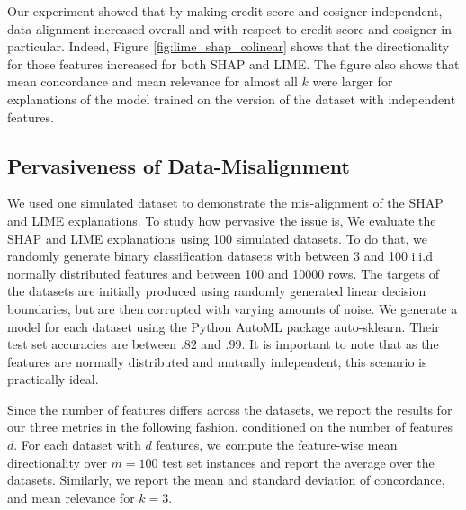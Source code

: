 \documentclass[12pt]{article}  %
\begin{document}
    Our experiment showed that by making credit score and cosigner independent, data-alignment increased overall and with respect to credit score and cosigner in particular. Indeed, Figure \ref{fig:lime_shap_colinear} shows that the directionality for those features increased for both SHAP and LIME. The figure also shows that mean concordance and mean relevance for almost all $k$ were larger for explanations of the model trained on the version of the dataset with independent features. 
   

\vspace{-3mm}  \subsection{Pervasiveness of Data-Misalignment}
    \label{sec:pervasive}\vspace{-3mm}
    We used one simulated dataset to demonstrate the mis-alignment of the SHAP and LIME explanations. To study how pervasive the issue is, %
    We evaluate the SHAP and LIME explanations using 100 simulated datasets. To do that, we randomly generate binary classification datasets with between 3 and 100 i.i.d normally distributed features and between 100 and 10000 rows.  The targets of the datasets are initially produced using randomly generated linear decision boundaries, but are then corrupted with varying amounts of noise. We generate a model for each dataset using the Python AutoML package auto-sklearn. Their test set accuracies are between $.82$ and $.99$. It is important to note that as the features are normally distributed and mutually independent, this scenario is practically ideal.  

    Since the number of features differs across the datasets, we report the results for our three metrics in the following fashion, conditioned on the number of features $d$. For each dataset with $d$ features, we compute the feature-wise mean directionality over $m=100$ test set instances and report the average over the datasets. Similarly, we report the mean and standard deviation of concordance, and mean relevance for $k=3$. 
\end{document}
